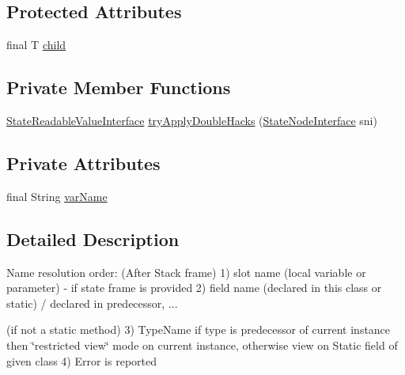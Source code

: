 \subsection*{Protected Attributes}
\begin{DoxyCompactItemize}
\item 
final T \hyperlink{classgov_1_1nasa_1_1jpf_1_1inspector_1_1server_1_1expression_1_1_expression_state_unary_operator_a66041b1f569a361549e28a00f7ca5f2f}{child}
\end{DoxyCompactItemize}
\subsection*{Private Member Functions}
\begin{DoxyCompactItemize}
\item 
\hyperlink{interfacegov_1_1nasa_1_1jpf_1_1inspector_1_1server_1_1programstate_1_1_state_readable_value_interface}{State\+Readable\+Value\+Interface} \hyperlink{classgov_1_1nasa_1_1jpf_1_1inspector_1_1server_1_1expression_1_1expressions_1_1_expression_state_value_name_a31818b0fc77a1e9504c48d24dffcbd59}{try\+Apply\+Double\+Hacks} (\hyperlink{interfacegov_1_1nasa_1_1jpf_1_1inspector_1_1server_1_1programstate_1_1_state_node_interface}{State\+Node\+Interface} sni)
\end{DoxyCompactItemize}
\subsection*{Private Attributes}
\begin{DoxyCompactItemize}
\item 
final String \hyperlink{classgov_1_1nasa_1_1jpf_1_1inspector_1_1server_1_1expression_1_1expressions_1_1_expression_state_value_name_a5861f8633f2b17e241b6c108a5671be3}{var\+Name}
\end{DoxyCompactItemize}


\subsection{Detailed Description}
Name resolution order\+: (After Stack frame) 1) slot name (local variable or parameter) -\/ if state frame is provided 2) field name (declared in this class or static) / declared in predecessor, ... 

(if not a static method) 3) Type\+Name if type is predecessor of current instance then \char`\"{}restricted view\char`\"{} mode on current instance, otherwise view on Static field of given class 4) Error is reported

